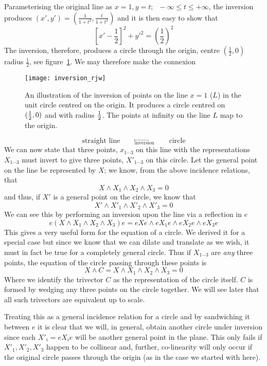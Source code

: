Parameterising the original line as $x=1, y=t;
\;\;-\infty \le t \le +\infty$, the inversion produces
$(x',y') = \left(\frac{1}{1+ t^2},\frac{t}{1+t^2}\right)$
and it is then easy to show that
%
\[ \left[x'-\frac{1}{2}\right]^2 + y'^2 = \left(\frac{1}{2}\right)^2  \]
%
The inversion, therefore, produces a circle through the origin,
centre $(\frac{1}{2},0)$ radius $\frac{1}{2}$, see
figure~\ref{figlinecircle}. We may therefore make the connexion
%
\begin{figure}
\centerline{
\texttt{[image: inversion\_rjw]}
} \caption{An illustration of the inversion of points on the
line $x=1$ ($L$) in the unit circle centred on the origin. It produces
a circle centred on $(\frac{1}{2},0)$ and with radius $\frac{1}{2}$. The points at 
infinity on the line $L$ map to the origin.} \label{figlinecircle}
\end{figure}
%
\[  \mbox{straight line}\qquad \stackrel{\longmapsto}{_{\mbox{inversion}}} \qquad \mbox{circle}  \]
%
We can now state that three points, $x_{1\cdots3}$ on this line
with the representations $X_{1\cdots3}$ must invert to give three
points, $X'_{1\cdots3}$ on this circle. Let the general
point on the line be represented by $X$; we know, from the above
incidence relations, that
%
\[  X\wedge X_1 \wedge X_2 \wedge X_3  = 0  \]
%
and thus, if $X'$ is a general point on the circle, we know
that
%
 \[  X'\wedge X'_1 \wedge X'_2 \wedge X'_3  = 0  \]
%
We can see this by performing an inversion upon the line via a reflection 
in $e$
%
 \[e(X\wedge X_1 \wedge X_2 \wedge X_3)e = eXe\wedge eX_1e \wedge eX_2e \wedge eX_3e\]
%
This gives a very useful form for the equation of a circle.  We derived
it for a special case but since we know that we can dilate and translate as we
wish, it must in fact be true for a completely general  circle.  Thus if
$X_{1\cdots3}$  are \emph{any} three points, the equation of the circle
passing through these points is
%
\begin{equation}
    X \wedge C = X \wedge X_1 \wedge X_2 \wedge X_3 = 0
    \end{equation}
%
Where we identify the trivector $C$ as the representation of the circle itself.
$C$ is formed by wedging any three points on the circle together. We will see
later that all such trivectors are equivalent up to scale.

Treating this as a general incidence relation for a circle and by sandwiching
it between $e$ it is clear that we will, in general, obtain
another circle under inversion since each $X'_i = eX_i e$ will be another
general point in the plane.  This only fails if $X'_1,X'_2,X'_3$ happen to be
collinear and, further, co-linearity will only occur if the original circle
passes through the origin (as in the case we started with here).

